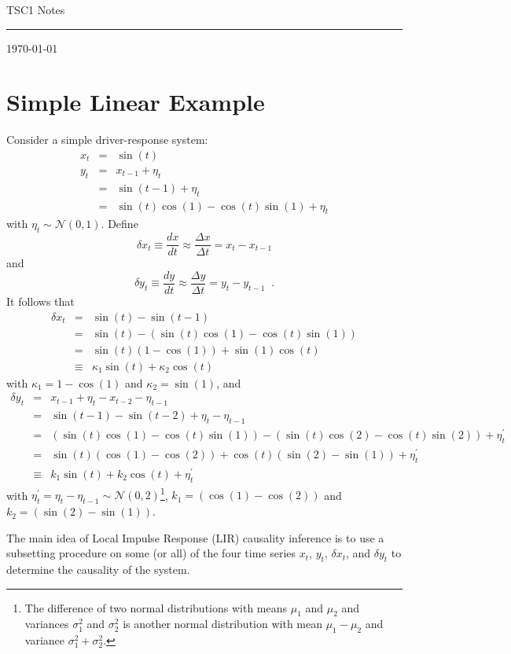 \documentclass[a4paper,11pt]{article}
\begin{document}
{\Huge TSC1 Notes}

\hfill\rule{150mm}{.1pt}

\hfill{\small \today}

\section{Simple Linear Example}
Consider a simple driver-response system:
\begin{eqnarray*}
x_t &=& \sin(t)\\
y_t &=& x_{t-1} + \eta_t\\
&=& \sin(t-1) + \eta_t\\
&=& \sin(t)\cos(1)-\cos(t)\sin(1)+ \eta_t
\end{eqnarray*}
with $\eta_t\sim \mathcal{N}(0,1)$.  Define
$$
\delta x_t \equiv \frac{dx}{dt} \approx \frac{\Delta x}{\Delta t} = x_t-x_{t-1}
$$
and
$$
\delta y_t \equiv \frac{dy}{dt} \approx \frac{\Delta y}{\Delta t} = y_t-y_{t-1}\;\;.
$$
It follows that
\begin{eqnarray*}
\delta x_t &=& \sin(t)-\sin(t-1)\\
&=& \sin(t)-\left(\sin(t)\cos(1)-\cos(t)\sin(1)\right)\\
&=& \sin(t)\left(1-\cos(1)\right)+\sin(1)\cos(t)\\
&\equiv& \kappa_1\sin(t)+\kappa_2\cos(t)
\end{eqnarray*}
with $\kappa_1 = 1-\cos(1)$ and $\kappa_2 = \sin(1)$, and
\begin{eqnarray*}
\delta y_t &=& x_{t-1} + \eta_t - x_{t-2} - \eta_{t-1}\\
&=& \sin(t-1) - \sin(t-2) + \eta_t - \eta_{t-1}\\
&=& \left(\sin(t)\cos(1)-\cos(t)\sin(1)\right) - \left(\sin(t)\cos(2)-\cos(t)\sin(2)\right)+\eta^\prime_t \\
&=& \sin(t)\left(\cos(1)-\cos(2)\right)+\cos(t)\left(\sin(2)-\sin(1)\right)+\eta^\prime_t\\
&\equiv& k_1\sin(t)+k_2\cos(t)+\eta^\prime_t
\end{eqnarray*}
with $\eta^\prime_t = \eta_t - \eta_{t-1} \sim \mathcal{N}(0,2)$\footnote{The difference of two normal distributions with means $\mu_1$ and $\mu_2$ and variances $\sigma^2_1$ and $\sigma^2_2$ is another normal distribution with mean $\mu_1-\mu_2$ and variance $\sigma^2_1+\sigma^2_2$.}, $k_1 = \left(\cos(1)-\cos(2)\right)$ and $k_2 = \left(\sin(2)-\sin(1)\right)$.

The main idea of Local Impulse Response (LIR) causality inference is to use a subsetting procedure on some (or all) of the four time series $x_t$, $y_t$, $\delta x_t$, and $\delta y_t$ to determine the causality of the system.
\end{document}
